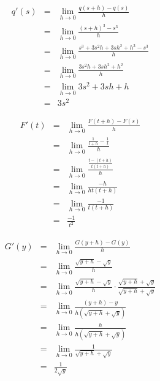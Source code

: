 \begin{activitySolution}
	\item  \begin{eqnarray*}
		q'(s) & = & \lim_{h \to 0} \frac{q(s+h) - q(s)}{h} \\
		       & = & \lim_{h \to 0} \frac{(s+h)^3 - s^3}{h} \\
		       & = & \lim_{h \to 0} \frac{s^3 + 3s^2h + 3sh^2 + h^3 - s^3}{h} \\
		       & = & \lim_{h \to 0} \frac{3s^2h + 3sh^2 + h^2}{h} \\
		       & = & \lim_{h \to 0} 3s^2 + 3sh + h \\
		       & = & 3s^2
		 \end{eqnarray*}
	\item  \begin{eqnarray*}
		F'(t) & = & \lim_{h \to 0} \frac{F(t+h) - F(s)}{h} \\
		       & = & \lim_{h \to 0} \frac{\frac{1}{t+h} - \frac{1}{t}}{h} \\
		       & = & \lim_{h \to 0} \frac{\frac{t - (t+h)}{t(t+h)}}{h} \\
		       & = & \lim_{h \to 0} \frac{-h}{ht(t+h)} \\
		       & = & \lim_{h \to 0} \frac{-1}{t(t+h)} \\
		       & = & \frac{-1}{t^2}
		 \end{eqnarray*}
	\item  \begin{eqnarray*}
		G'(y) & = & \lim_{h \to 0} \frac{G(y+h) - G(y)}{h} \\
		       & = & \lim_{h \to 0} \frac{\sqrt{y+h}-\sqrt{y}}{h} \\
		       & = & \lim_{h \to 0} \frac{\sqrt{y+h}-\sqrt{y}}{h} \cdot \frac{\sqrt{y+h} + \sqrt{y}}{\sqrt{y+h} + \sqrt{y}} \\
		       & = & \lim_{h \to 0} \frac{(y+h)-y}{h(\sqrt{y+h} + \sqrt{y})} \\
		       & = & \lim_{h \to 0} \frac{h}{h(\sqrt{y+h} + \sqrt{y})} \\
		       & = & \lim_{h \to 0} \frac{1}{\sqrt{y+h} + \sqrt{y}} \\
		       & = & \frac{1}{2\sqrt{y}}
		 \end{eqnarray*}		 
\ea
\end{activitySolution}
\aftera